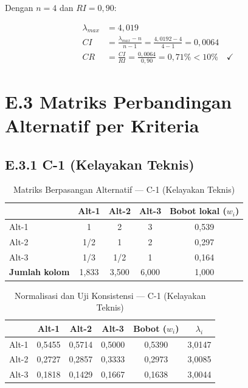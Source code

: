 Dengan $n = 4$ dan $RI = 0{,}90$:

\begin{align*}
  \lambda_{max} &= 4{,}019 \\
  CI &= \frac{\lambda_{max} - n}{n - 1} = \frac{4{,}0192 - 4}{4 - 1} = 0{,}0064 \\
  CR &= \frac{CI}{RI} = \frac{0{,}0064}{0{,}90} = 0{,}71\% < 10\% \quad \checkmark
\end{align*}

\section*{E.3 Matriks Perbandingan Alternatif per Kriteria}

\subsection*{E.3.1 C-1 (Kelayakan Teknis)}

\begin{table}[H]
  \caption{Matriks Berpasangan Alternatif --- C-1 (Kelayakan Teknis)}
  \label{tab:matriks-c1}
  \centering
  \begin{tabular}{| l | c | c | c | c |}
    \hline
    & \textbf{Alt-1} & \textbf{Alt-2} & \textbf{Alt-3} & \textbf{Bobot lokal ($w_i$)} \\
    \hline
    Alt-1 & 1     & 2   & 3 & 0,539 \\
    \hline
    Alt-2 & 1/2   & 1   & 2 & 0,297 \\
    \hline
    Alt-3 & 1/3   & 1/2 & 1 & 0,164 \\
    \hline
    \textbf{Jumlah kolom} & 1,833 & 3,500 & 6,000 & 1,000 \\
    \hline
  \end{tabular}
\end{table}

\begin{table}[H]
  \caption{Normalisasi dan Uji Konsistensi --- C-1 (Kelayakan Teknis)}
  \label{tab:norm-c1}
  \centering
  \begin{tabular}{| l | c | c | c | c | c |}
    \hline
    & \textbf{Alt-1} & \textbf{Alt-2} & \textbf{Alt-3} & \textbf{Bobot ($w_i$)} & \textbf{$\lambda_i$} \\
    \hline
    Alt-1 & 0,5455 & 0,5714 & 0,5000 & 0,5390 & 3,0147 \\
    \hline
    Alt-2 & 0,2727 & 0,2857 & 0,3333 & 0,2973 & 3,0085 \\
    \hline
    Alt-3 & 0,1818 & 0,1429 & 0,1667 & 0,1638 & 3,0044 \\
    \hline
  \end{tabular}
\end{table}

